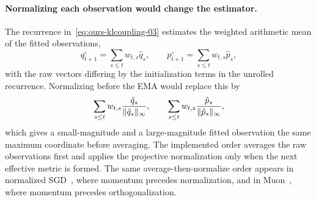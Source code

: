 \paragraph{Normalizing each observation would change the estimator.}
The recurrence in~\eqref{eq:ours-klcoupling-03} estimates the weighted
arithmetic mean of the fitted observations,
\[
  q^\circ_{t+1}=\sum_{s\le t}w_{t,s}\hat q_s,
  \qquad
  p^\circ_{t+1}=\sum_{s\le t}w_{t,s}\hat p_s,
\]
with the raw vectors differing by the initialization terms in the unrolled
recurrence. Normalizing before the EMA would replace this by
\[
  \sum_{s\le t}w_{t,s}\frac{\hat q_s}{\| \hat q_s\|_\infty},
  \qquad
  \sum_{s\le t}w_{t,s}\frac{\hat p_s}{\| \hat p_s\|_\infty},
\]
which gives a small-magnitude and a large-magnitude fitted observation the
same maximum coordinate before averaging. The implemented order averages the
raw observations first and applies the projective normalization only when the
next effective metric is formed. The same average-then-normalize order appears
in normalized SGD~\cite{cutkosky_nigt}, where momentum precedes
normalization, and in Muon~\cite{denoise_ortho}, where momentum precedes
orthogonalization.
